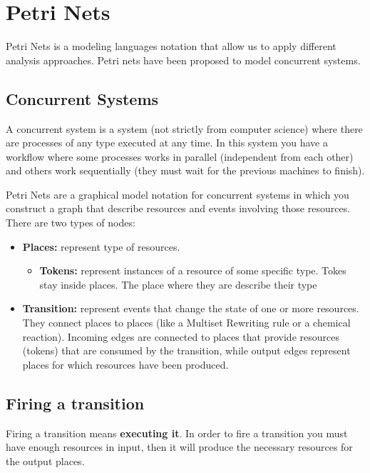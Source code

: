 \chapter{Petri Nets}
Petri Nets is a modeling languages notation that allow us to apply different analysis approaches. Petri nets have been proposed to model concurrent systems. 

\section{Concurrent Systems}
A concurrent system is a system (not strictly from computer science) where there are processes of any type executed at any time. In this system you have a workflow where some processes works in parallel (independent from each other) and others work sequentially (they must wait for the previous machines to finish).\par

Petri Nets are a graphical model notation for concurrent systems in which you construct a graph that describe resources and events involving those resources. There are two types of nodes:

\begin{itemize}
    \item \textbf{Places:} represent type of resources. 
        \begin{itemize}
            \item \textbf{Tokens:} represent instances of a resource of some specific type. Tokes stay inside places. The place where they are describe their type
        \end{itemize}
    \item \textbf{Transition:} represent events that change the state of one or more resources. They connect places to places (like a Multiset Rewriting rule or a chemical reaction). Incoming edges are connected to places that provide resources (tokens) that are consumed by the transition, while output edges represent places for which resources have been produced.
\end{itemize}

\section{Firing a transition}
Firing a transition means \textbf{executing it}. In order to fire a transition you must have enough resources in input, then it will produce the necessary resources for the output places.

